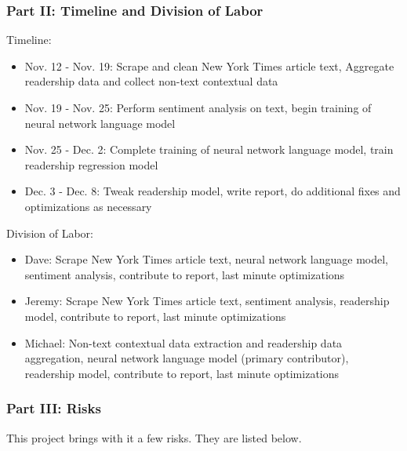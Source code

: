 \documentclass[10pt]{article}
\begin{document}
\subsubsection*{Part II: Timeline and Division of Labor}

Timeline:
\begin{itemize}
\item Nov. 12 - Nov. 19: Scrape and clean New York Times article text, Aggregate readership data and collect non-text contextual data
\item Nov. 19 - Nov. 25: Perform sentiment analysis on text, begin training of neural network language model
\item Nov. 25 - Dec. 2: Complete training of neural network language model, train readership regression model
\item Dec. 3 - Dec. 8: Tweak readership model, write report, do additional fixes and optimizations as necessary
\end{itemize}

Division of Labor:
\begin{itemize}
\item Dave: Scrape New York Times article text, neural network language model, sentiment analysis, contribute to report, last minute optimizations
\item Jeremy: Scrape New York Times article text, sentiment analysis, readership model, contribute to report, last minute optimizations
\item Michael: Non-text contextual data extraction and readership data aggregation, neural network language model (primary contributor), readership model, contribute to report, last minute optimizations
\end{itemize}

\subsubsection*{Part III: Risks}

This project brings with it a few risks. They are listed below.
\end{document}
